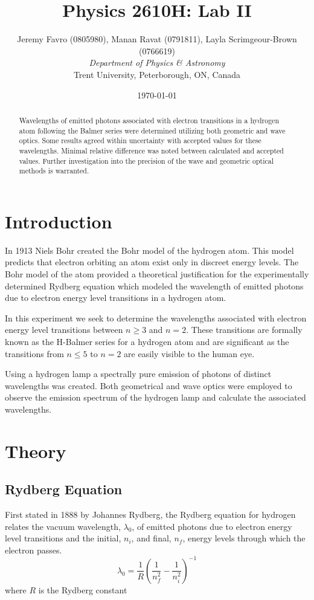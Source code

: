 \documentclass[10pt, twocolumn]{article}
\title{Physics 2610H: Lab II}
\author{Jeremy Favro (0805980),
Manan Ravat (0791811),
Layla Scrimgeour-Brown (0766619)
 \\\emph{Department of Physics \& Astronomy}\\ Trent University, Peterborough, ON, Canada}
\date{\today}
\theoremstyle{definition}
\begin{document}
\maketitle
\begin{abstract}
  Wavelengths of emitted photons associated with electron transitions in a hydrogen atom following the Balmer series were determined utilizing both geometric and wave optics.
  Some results agreed within uncertainty with accepted values for these wavelengths. Minimal relative difference was noted between calculated and accepted values. Further
  investigation into the precision of the wave and geometric optical methods is warranted.
\end{abstract}
\section{Introduction}
In 1913 Niels Bohr created the Bohr model of the hydrogen atom. This model predicts that electron orbiting an atom exist only in discreet
energy levels. The Bohr model of the atom provided a theoretical justification for the experimentally determined Rydberg equation
which modeled the wavelength of emitted photons due to electron energy level transitions in a hydrogen atom.

In this experiment we seek to determine the wavelengths associated with electron energy level transitions between $n\geq 3$ and $n=2$.
These transitions are formally known as the H-Balmer series for a hydrogen atom and are significant as the transitions from $n\leq 5$ to $n=2$ are
easily visible to the human eye\cite{lab-manual}.

Using a hydrogen lamp a spectrally pure emission of photons of distinct wavelengths was created. Both
geometrical and wave optics were employed to observe the emission spectrum of the hydrogen lamp and calculate the associated wavelengths.
\section{Theory}
\subsection{Rydberg Equation}
First stated in 1888 by Johannes Rydberg, the Rydberg equation for hydrogen relates the vacuum wavelength, $\lambda_0$, of emitted photons due to electron energy level transitions
and the initial, $n_i$, and final, $n_f$, energy levels through which the electron passes.
\begin{equation}
  \lambda_{0}=\frac{1}{R}\left(\frac{1}{n_f^2}-\frac{1}{n_i^2}\right)^{-1}
\end{equation}
where $R$ is the Rydberg constant \cite{codata}
\end{document}
